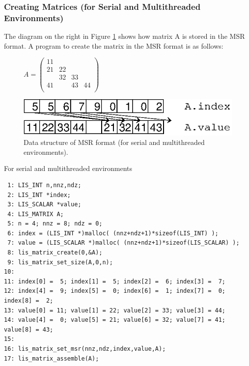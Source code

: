 \documentclass[a4paper]{article}
\begin{document}
\subsubsection{Creating Matrices (for Serial and Multithreaded Environments)}
The diagram on the right in Figure \ref{fig:storage03} shows how matrix A is stored in the MSR format. A program to create the matrix in the MSR format is as follows:
\begin{figure}[h]
{\centering 
\begin{minipage}{0.3\textwidth}
\begin{flushright}
$ 
A = \left(
\begin{array}{cccc}
11 &    &    &    \\
21 & 22 &    &    \\
   & 32 & 33 &    \\
41 &    & 43 & 44 \\
\end{array}\right)
$
\end{flushright}
\end{minipage}
\begin{minipage}{0.6\textwidth}
\begin{flushleft}
\includegraphics{storage03.eps} 
\end{flushleft}
\end{minipage}
\caption{Data structure of MSR format (for serial and multithreaded environments).}\label{fig:storage03}}
\end{figure}
\begin{itemsquarebox}[l]{For serial and multithreaded environments}
\small
\begin{verbatim}
 1: LIS_INT n,nnz,ndz;
 2: LIS_INT *index;
 3: LIS_SCALAR *value;
 4: LIS_MATRIX A;
 5: n = 4; nnz = 8; ndz = 0;
 6: index = (LIS_INT *)malloc( (nnz+ndz+1)*sizeof(LIS_INT) );
 7: value = (LIS_SCALAR *)malloc( (nnz+ndz+1)*sizeof(LIS_SCALAR) );
 8: lis_matrix_create(0,&A);
 9: lis_matrix_set_size(A,0,n);
10:
11: index[0] =  5; index[1] =  5; index[2] =  6; index[3] =  7;
12: index[4] =  9; index[5] =  0; index[6] =  1; index[7] =  0; index[8] =  2;
13: value[0] = 11; value[1] = 22; value[2] = 33; value[3] = 44;
14: value[4] =  0; value[5] = 21; value[6] = 32; value[7] = 41; value[8] = 43;
15:
16: lis_matrix_set_msr(nnz,ndz,index,value,A);
17: lis_matrix_assemble(A);
\end{verbatim}
\end{itemsquarebox}
\end{document}
